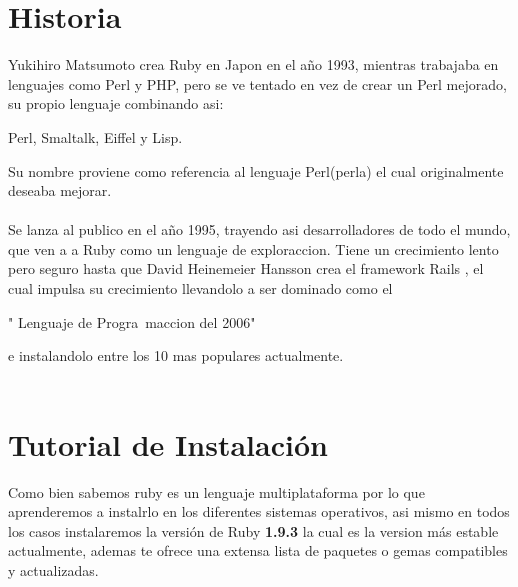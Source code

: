\documentclass[11pt]{article} %
\begin{document}
\section{\fontsize{14}{0} \bf Historia}
Yukihiro Matsumoto crea  Ruby  en Japon en el año 1993, mientras trabajaba en lenguajes como Perl y PHP, pero se ve tentado en vez de crear un Perl mejorado,  su propio lenguaje combinando asi: \begin{bf}
Perl, Smaltalk, Eiffel y Lisp.
\end{bf} Su nombre proviene como referencia al lenguaje Perl(perla) el cual originalmente deseaba mejorar.\\ \\Se lanza al publico en el año 1995, trayendo asi desarrolladores de todo el mundo, que ven a a Ruby como un lenguaje de exploraccion. Tiene un crecimiento lento pero seguro hasta que David Heinemeier Hansson crea el framework Rails , el cual impulsa su crecimiento llevandolo a ser dominado como el
\begin{bf}
" Lenguaje de Progra~maccion del 2006" 
\end{bf} e instalandolo entre los 10 mas populares actualmente.\\ \\


\section{\fontsize{14}{0} \bf Tutorial de Instalación}

Como bien sabemos ruby es un lenguaje multiplataforma por lo que aprenderemos a instalrlo en los diferentes sistemas operativos, asi mismo en todos los casos instalaremos la versión de Ruby {\bf 1.9.3} la cual es la version más estable actualmente, ademas te ofrece una extensa lista de paquetes o gemas compatibles y actualizadas.
\newpage
\end{document}

